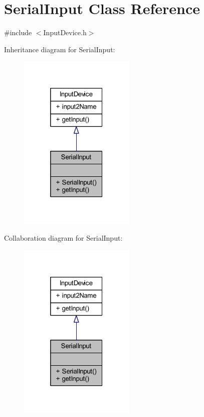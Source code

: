 \hypertarget{class_serial_input}{}\section{Serial\+Input Class Reference}
\label{class_serial_input}


{\ttfamily \#include $<$Input\+Device.\+h$>$}



Inheritance diagram for Serial\+Input\+:
\nopagebreak
\begin{figure}[H]
\begin{center}
\leavevmode
\includegraphics[width=157pt]{class_serial_input__inherit__graph}
\end{center}
\end{figure}


Collaboration diagram for Serial\+Input\+:
\nopagebreak
\begin{figure}[H]
\begin{center}
\leavevmode
\includegraphics[width=157pt]{class_serial_input__coll__graph}
\end{center}
\end{figure}
